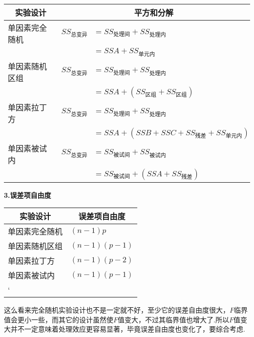 {    \renewcommand\arraystretch{1.25}
    \begin{tabular}{rrl}
    \toprule
        \multicolumn{1}{c}{\textcolor[rgb]{ .208,  .204,  .161}{实验设计}} & \multicolumn{2}{c}{\textcolor[rgb]{ .208,  .204,  .161}{平方和分解}} \\
    \midrule
        \multicolumn{1}{l}{单因素完全随机} & \multicolumn{1}{l}{$SS_{\text{总变异}}$} & $=SS_{\text{处理间}}+SS_{\text{处理内}}$ \\
              &       & $=SSA+SS_{\text{单元内}}$ \\
        \multicolumn{1}{l}{单因素随机区组} & \multicolumn{1}{l}{$SS_{\text{总变异}}$} & $=SS_{\text{处理间}}+SS_{\text{处理内}}$ \\
              &       & $ =SSA + \left(  SS_{\text{区组}} + SS_{\text{区组}} \right) $ \\
        \multicolumn{1}{l}{单因素拉丁方} & \multicolumn{1}{l}{$SS_{\text{总变异}}$} & $=SS_{\text{处理间}}+SS_{\text{处理内}}$ \\
              &       & $=SSA+\left(  SSB +SSC +SS_{\text{残差}}+SS_{\text{单元内}} \right)$  \\
        \multicolumn{1}{l}{单因素被试内} & \multicolumn{1}{l}{$SS_{\text{总变异}}$} & $=SS_{\text{被试间}}+SS_{\text{被试内}}$ \\
              &       & $=SS_{\text{被试间}}+\left(  SSA + SS_{\text{残差}}  \right)$ \\
    \bottomrule
    \end{tabular}}
    
\textbf{3.误差项自由度}

{
    \renewcommand\arraystretch{1.25}
    \begin{tabular}{ll}
        \toprule
        \multicolumn{1}{c}{实验设计}          &    \multicolumn{1}{c}{误差项自由度}\\
        \midrule
        单因素完全随机    &    $(n-1)p$\\
        单因素随机区组    &    $(n-1)(p-1)$\\
        单因素拉丁方      &    $(n-1)(p-2)$\\
        单因素被试内      &    $(n-1)(p-1)$\\
        \bottomrule`
    \end{tabular}    
}

这么看来完全随机实验设计也不是一定就不好，至少它的误差自由度很大，$F$临界值会更小一些，而其它的设计虽然使$F$值变大，不过其临界值也增大了.所以$F$值变大并不一定意味着处理效应更容易显著，毕竟误差自由度也变化了，要综合考虑.

